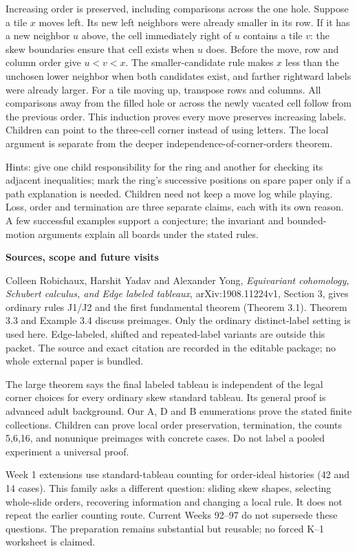 \documentclass[11pt]{article}
\newcommand{\heading}[1]{\par\textbf{#1}\par}
\begin{document}
Increasing order is preserved, including comparisons across the one hole. Suppose a tile $x$ moves left. Its new left neighbors were already smaller in its row. If it has a new neighbor $u$ above, the cell immediately right of $u$ contains a tile $v$: the skew boundaries ensure that cell exists when $u$ does. Before the move, row and column order give $u<v<x$. The smaller-candidate rule makes $x$ less than the unchosen lower neighbor when both candidates exist, and farther rightward labels were already larger. For a tile moving up, transpose rows and columns. All comparisons away from the filled hole or across the newly vacated cell follow from the previous order. This induction proves every move preserves increasing labels. Children can point to the three-cell corner instead of using letters. The local argument is separate from the deeper independence-of-corner-orders theorem.

Hints: give one child responsibility for the ring and another for checking its adjacent inequalities; mark the ring's successive positions on spare paper only if a path explanation is needed. Children need not keep a move log while playing. Loss, order and termination are three separate claims, each with its own reason. A few successful examples support a conjecture; the invariant and bounded-motion arguments explain all boards under the stated rules.
\newpage
\heading{Sources, scope and future visits}
Colleen Robichaux, Harshit Yadav and Alexander Yong, \emph{Equivariant cohomology, Schubert calculus, and Edge labeled tableaux}, arXiv:1908.11224v1, Section 3, gives ordinary rules J1/J2 and the first fundamental theorem (Theorem 3.1). Theorem 3.3 and Example 3.4 discuss preimages. Only the ordinary distinct-label setting is used here. Edge-labeled, shifted and repeated-label variants are outside this packet. The source and exact citation are recorded in the editable package; no whole external paper is bundled.

The large theorem says the final labeled tableau is independent of the legal corner choices for every ordinary skew standard tableau. Its general proof is advanced adult background. Our A, D and B enumerations prove the stated finite collections. Children can prove local order preservation, termination, the counts 5,6,16, and nonunique preimages with concrete cases. Do not label a pooled experiment a universal proof.

Week 1 extensions use standard-tableau counting for order-ideal histories (42 and 14 cases). This family asks a different question: sliding skew shapes, selecting whole-slide orders, recovering information and changing a local rule. It does not repeat the earlier counting route. Current Weeks 92--97 do not supersede these questions. The preparation remains substantial but reusable; no forced K--1 worksheet is claimed.
\end{document}
